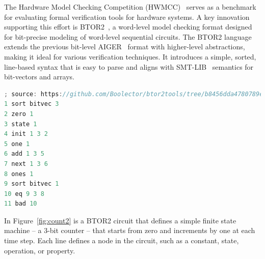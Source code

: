 
The Hardware Model Checking Competition (HWMCC)~\cite{hwmcc} serves as a benchmark for evaluating formal verification tools for hardware systems. A key innovation supporting this effort is BTOR2~\cite{btor2}, a word-level model checking format designed for bit-precise modeling of word-level sequential circuits.
The BTOR2 language extends the previous bit-level AIGER~\cite{AIGER} format with higher-level abstractions, making it ideal for various verification techniques. It introduces a simple, sorted, line-based syntax that is easy to parse and aligns with SMT-LIB~\cite{SMT-LIB} semantics for bit-vectors and arrays.




\lstset{style=mystyle}
\begin{lstlisting}[language=Verilog, caption=BTOR2 example]
; source: https://github.com/Boolector/btor2tools/tree/b8456dda4780789e882f5791eb486f295ade4da4/examples/btorsim
1 sort bitvec 3
2 zero 1
3 state 1
4 init 1 3 2
5 one 1
6 add 1 3 5
7 next 1 3 6
8 ones 1
9 sort bitvec 1
10 eq 9 3 8
11 bad 10
\end{lstlisting}


In Figure~\ref{fig:count2} is a BTOR2 circuit that defines a simple finite state machine -- a 3-bit counter -- that starts from zero and increments by one at each time step. Each line defines a node in the circuit, such as a constant, state, operation, or property.

